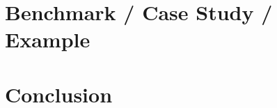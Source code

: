 \section{Benchmark / Case Study / Example}

\begin{comment}

\clearpage
\end{comment}
\section{Conclusion}
\begin{comment}

final observations
suggestions for future work


\end{comment}











































\clearemptydoublepage

\appendix
% 
% 
% 

\clearemptydoublepage





